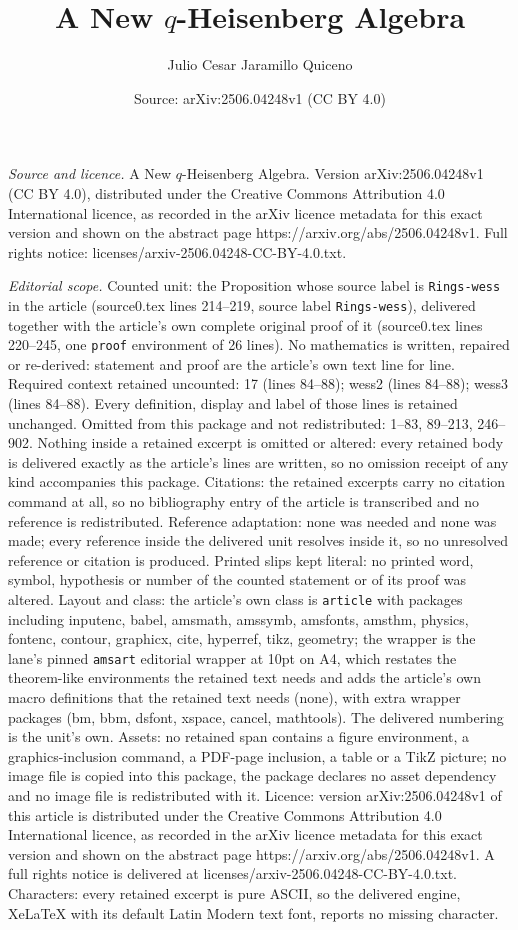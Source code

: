 \documentclass[10pt,a4paper]{amsart}
\title[A New $q$-Heisenberg Algebra]{A New $q$-Heisenberg Algebra}
\author{Julio Cesar Jaramillo Quiceno}
\date{Source: arXiv:2506.04248v1 (CC BY 4.0)}
\begin{document}
\maketitle

\noindent\emph{Source and licence.} A New $q$-Heisenberg Algebra. Version arXiv:2506.04248v1 (CC BY 4.0), distributed under the Creative Commons Attribution 4.0 International licence, as recorded in the arXiv licence metadata for this exact version and shown on the abstract page https://arxiv.org/abs/2506.04248v1. Full rights notice: licenses/arxiv-2506.04248-CC-BY-4.0.txt.\par\smallskip

\noindent\textit{Editorial scope.} Counted unit: the Proposition whose source label is \texttt{Rings-wess} in the article (source0.tex lines 214--219, source label \texttt{Rings-wess}), delivered together with the article's own complete original proof of it (source0.tex lines 220--245, one \texttt{proof} environment of 26 lines). No mathematics is written, repaired or re-derived: statement and proof are the article's own text line for line. Required context retained uncounted: 17 (lines 84--88); wess2 (lines 84--88); wess3 (lines 84--88). Every definition, display and label of those lines is retained unchanged. Omitted from this package and not redistributed: 1--83, 89--213, 246--902. Nothing inside a retained excerpt is omitted or altered: every retained body is delivered exactly as the article's lines are written, so no omission receipt of any kind accompanies this package. Citations: the retained excerpts carry no citation command at all, so no bibliography entry of the article is transcribed and no reference is redistributed. Reference adaptation: none was needed and none was made; every reference inside the delivered unit resolves inside it, so no unresolved reference or citation is produced. Printed slips kept literal: no printed word, symbol, hypothesis or number of the counted statement or of its proof was altered. Layout and class: the article's own class is \texttt{article} with packages including inputenc, babel, amsmath, amssymb, amsfonts, amsthm, physics, fontenc, contour, graphicx, cite, hyperref, tikz, geometry; the wrapper is the lane's pinned \texttt{amsart} editorial wrapper at 10pt on A4, which restates the theorem-like environments the retained text needs and adds the article's own macro definitions that the retained text needs (none), with extra wrapper packages (bm, bbm, dsfont, xspace, cancel, mathtools). The delivered numbering is the unit's own. Assets: no retained span contains a figure environment, a graphics-inclusion command, a PDF-page inclusion, a table or a TikZ picture; no image file is copied into this package, the package declares no asset dependency and no image file is redistributed with it. Licence: version arXiv:2506.04248v1 of this article is distributed under the Creative Commons Attribution 4.0 International licence, as recorded in the arXiv licence metadata for this exact version and shown on the abstract page https://arxiv.org/abs/2506.04248v1. A full rights notice is delivered at licenses/arxiv-2506.04248-CC-BY-4.0.txt. Characters: every retained excerpt is pure ASCII, so the delivered engine, XeLaTeX with its default Latin Modern text font, reports no missing character.
\end{document}
